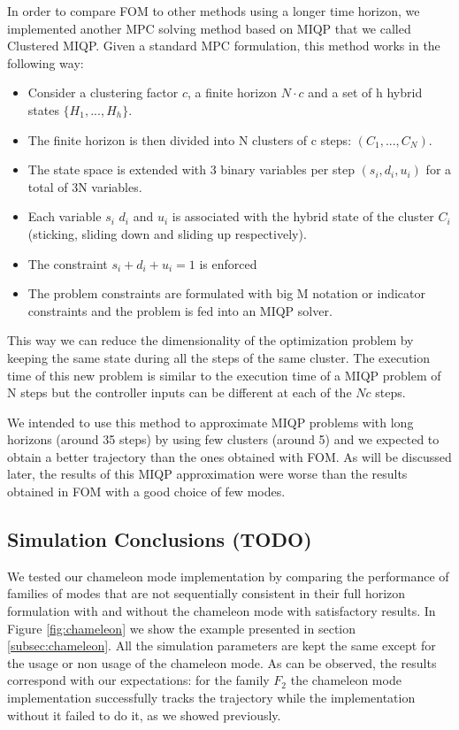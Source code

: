 \documentclass[12,twoside]{TFG-GM}
\theoremstyle{definition}
\theoremstyle{remark}
\begin{document}
In order to compare FOM to other methods using a longer time horizon, we implemented another MPC solving method based on MIQP that we called Clustered MIQP. Given a standard MPC formulation, this method works in the following way:

\begin{itemize}
\item Consider a clustering factor $c$, a finite horizon $ N \cdot c$ and a set of h hybrid states $ \{ H_1, ..., H_h \}$.
\item The finite horizon is then divided into N clusters of c steps: $(C_1, ..., C_N)$.
\item The state space is extended with 3 binary variables per step $(s_i, d_i, u_i)$ for a total of 3N variables.
\item Each variable $s_i$ $d_i$ and $u_i$ is associated with the hybrid state of the cluster $C_i$ (sticking, sliding down and sliding up respectively).
\item The constraint $s_i + d_i + u_i = 1$ is enforced 
\item The problem constraints are formulated with big M notation or indicator constraints and the problem is fed into an MIQP solver.
\end{itemize}

This way we can reduce the dimensionality of the optimization problem by keeping the same state during all the steps of the same cluster. The execution time of this new problem is similar to the execution time of a MIQP problem of N steps but the controller inputs can be different at each of the $N c$ steps.

We intended to use this method to approximate MIQP problems with long horizons (around 35 steps) by using few clusters (around 5) and we expected to obtain a better trajectory than the ones obtained with FOM. As will be discussed later, the results of this MIQP approximation were worse than the results obtained in FOM with a good choice of few modes.

\subsection{Simulation Conclusions (TODO)}
\label{subsec:simresults}

We tested our chameleon mode implementation by comparing the performance of families of modes that are not sequentially consistent in their full horizon formulation with and without the chameleon mode with satisfactory results. In Figure \ref{fig:chameleon} we show the example presented in section \ref{subsec:chameleon}. All the simulation parameters are kept the same except for the usage or non usage of the chameleon mode. As can be observed, the results correspond with our expectations: for the family $F_2$ the chameleon mode implementation successfully tracks the trajectory while the implementation without it failed to do it, as we showed previously.
\end{document}
